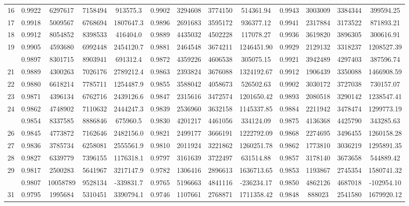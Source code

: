 \documentclass[
  12pt,
]{article}
\begin{document}
\begin{longtable}[t]{lcccccccccccc}
16 & 0.9922 & 6297617 & 7158494 & 913575.3 & 0.9902 & 3294608 & 3774150 & 514361.94 & 0.9943 & 3003009 & 3384344 & 399594.25\\
17 & 0.9918 & 5009567 & 6768694 & 1807647.3 & 0.9896 & 2691683 & 3595172 & 936377.12 & 0.9941 & 2317884 & 3173522 & 871893.21\\
18 & 0.9912 & 8054852 & 8398533 & 416404.0 & 0.9889 & 4435032 & 4502228 & 117078.27 & 0.9936 & 3619820 & 3896305 & 300616.91\\
19 & 0.9905 & 4593680 & 6992448 & 2454120.7 & 0.9881 & 2464548 & 3674211 & 1246451.90 & 0.9929 & 2129132 & 3318237 & 1208527.39\\
\addlinespace
20 & 0.9897 & 8301715 & 8903941 & 691312.4 & 0.9872 & 4359226 & 4606538 & 305075.15 & 0.9921 & 3942489 & 4297403 & 387596.74\\
21 & 0.9889 & 4300263 & 7026176 & 2789212.4 & 0.9863 & 2393824 & 3676088 & 1324192.67 & 0.9912 & 1906439 & 3350088 & 1466908.59\\
22 & 0.9880 & 6618214 & 7785711 & 1254487.9 & 0.9855 & 3588042 & 4058673 & 526502.63 & 0.9902 & 3030172 & 3727038 & 730157.07\\
23 & 0.9871 & 4396134 & 6762716 & 2439126.6 & 0.9847 & 2315616 & 3472574 & 1201650.42 & 0.9893 & 2080518 & 3290142 & 1238547.41\\
24 & 0.9862 & 4748902 & 7110632 & 2444247.3 & 0.9839 & 2536960 & 3632158 & 1145337.85 & 0.9884 & 2211942 & 3478474 & 1299773.19\\
\addlinespace
25 & 0.9854 & 8337585 & 8886846 & 675960.5 & 0.9830 & 4201217 & 4461056 & 334124.09 & 0.9875 & 4136368 & 4425790 & 343285.63\\
26 & 0.9845 & 4773872 & 7162646 & 2482156.0 & 0.9821 & 2499177 & 3666191 & 1222792.09 & 0.9868 & 2274695 & 3496455 & 1260158.28\\
27 & 0.9836 & 3785734 & 6258081 & 2555561.9 & 0.9810 & 2011924 & 3221862 & 1260251.78 & 0.9862 & 1773810 & 3036219 & 1295891.35\\
28 & 0.9827 & 6339779 & 7396155 & 1176318.1 & 0.9797 & 3161639 & 3722497 & 631514.88 & 0.9857 & 3178140 & 3673658 & 544889.42\\
29 & 0.9817 & 2500283 & 5641967 & 3217147.9 & 0.9782 & 1306416 & 2896613 & 1636713.65 & 0.9853 & 1193867 & 2745354 & 1580741.32\\
\addlinespace
30 & 0.9807 & 10058789 & 9528134 & -339831.7 & 0.9765 & 5196663 & 4841116 & -236234.17 & 0.9850 & 4862126 & 4687018 & -102954.10\\
31 & 0.9795 & 1995684 & 5310451 & 3390794.1 & 0.9746 & 1107661 & 2768871 & 1711358.42 & 0.9848 & 888023 & 2541580 & 1679920.12\\

\end{longtable}
\end{document}
